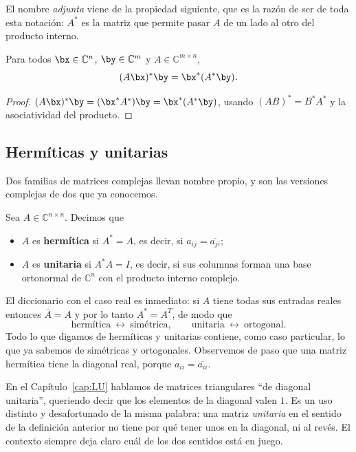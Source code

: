 El nombre \emph{adjunta} viene de la propiedad siguiente, que es la razón de ser de toda
esta notación: $A^{*}$ es la matriz que permite pasar $A$ de un lado al otro del
producto interno.

\begin{proposicion}\label{prop:adjunta}
Para todos $\bx\in\mathbb{C}^{n}$, $\by\in\mathbb{C}^{m}$ y $A\in\mathbb{C}^{m\times n}$,
\[
(A\bx)^{*}\by=\bx^{*}(A^{*}\by) .
\]
\end{proposicion}

\begin{proof}
$(A\bx)^{*}\by=(\bx^{*}A^{*})\by=\bx^{*}(A^{*}\by)$, usando $(AB)^{*}=B^{*}A^{*}$ y la
asociatividad del producto.
\end{proof}

\subsection*{Hermíticas y unitarias}

Dos familias de matrices complejas llevan nombre propio, y son las versiones complejas
de dos que ya conocemos.

\begin{definicion}\label{def:hermitica-unitaria}
Sea $A\in\mathbb{C}^{n\times n}$. Decimos que
\begin{itemize}[itemsep=2pt,topsep=3pt]
\item $A$ es \textbf{hermítica} si $A^{*}=A$, es decir, si $a_{ij}=\overline{a_{ji}}$;
\item $A$ es \textbf{unitaria} si $A^{*}A=I$, es decir, si sus columnas forman una base
ortonormal de $\mathbb{C}^n$ con el producto interno complejo.
\end{itemize}
\end{definicion}

El diccionario con el caso real es inmediato: si $A$ tiene todas sus entradas reales
entonces $\overline{A}=A$ y por lo tanto $A^{*}=A^{T}$, de modo que
\[
\text{hermítica}\ \longleftrightarrow\ \text{simétrica},
\qquad
\text{unitaria}\ \longleftrightarrow\ \text{ortogonal}.
\]
Todo lo que digamos de hermíticas y unitarias contiene, como caso particular, lo que ya
sabemos de simétricas y ortogonales. Observemos de paso que una matriz hermítica tiene
la diagonal real, porque $a_{ii}=\overline{a_{ii}}$.

\begin{observacion}
En el Capítulo~\ref{cap:LU} hablamos de matrices triangulares ``de diagonal unitaria'',
queriendo decir que los elementos de la diagonal valen $1$. Es un uso distinto y
desafortunado de la misma palabra: una matriz \emph{unitaria} en el sentido de la
definición anterior no tiene por qué tener unos en la diagonal, ni al revés. El contexto
siempre deja claro cuál de los dos sentidos está en juego.
\end{observacion}

